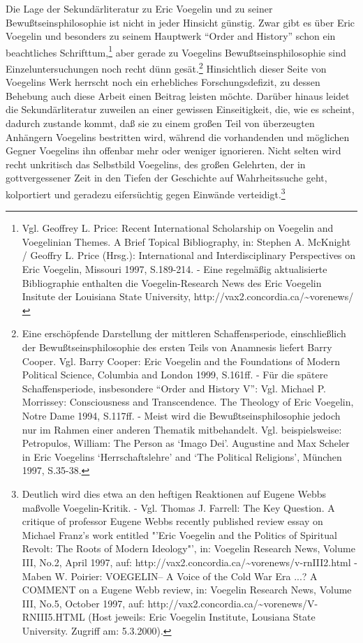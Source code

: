 Die Lage der Sekundärliteratur zu Eric Voegelin und zu seiner
Bewußtseinsphilosophie ist nicht in jeder Hinsicht günstig. Zwar gibt es über
Eric Voegelin und besonders zu seinem Hauptwerk "`Order and History"' schon
ein beachtliches Schrifttum,\footnote{Vgl. Geoffrey L. Price: Recent
  International Scholarship on Voegelin and Voegelinian Themes. A Brief
  Topical Bibliography, in: Stephen A. McKnight / Geoffry L. Price (Hrsg.):
  International and Interdisciplinary Perspectives on Eric Voegelin, Missouri
  1997, S.189-214. - Eine regelmäßig aktualisierte Bibliographie enthalten die
  Voegelin-Research News des Eric Voegelin Insitute der Louisiana State
  University, http://vax2.concordia.ca/\~{ }vorenews/} aber gerade zu Voegelins
Bewußtseinsphilosophie sind Einzeluntersuchungen noch recht dünn
gesät.\footnote{Eine erschöpfende Darstellung der mittleren Schaffensperiode,
  einschließlich der Bewußtseinsphilosophie des ersten Teils von Anamnesis
  liefert Barry Cooper. Vgl. Barry Cooper: Eric Voegelin and the Foundations
  of Modern Political Science, Columbia and London 1999, S.161ff. - Für die
  spätere Schaffensperiode, insbesondere "`Order and History V"': Vgl. Michael
  P. Morrissey: Consciousness and Transcendence. The Theology of Eric
  Voegelin, Notre Dame 1994, S.117ff. - Meist wird die Bewußtseinsphilosophie
  jedoch nur im Rahmen einer anderen Thematik mitbehandelt. Vgl.
  beispielsweise: Petropulos, William: The Person as `Imago Dei'. Augustine
  and Max Scheler in Eric Voegelins `Herrschaftslehre' and `The Political
  Religions', München 1997, S.35-38.} Hinsichtlich dieser Seite von Voegelins
Werk herrscht noch ein erhebliches Forschungsdefizit, zu dessen Behebung auch
diese Arbeit einen Beitrag leisten möchte. Darüber hinaus leidet die
Sekundärliteratur zuweilen an einer gewissen Einseitigkeit, die, wie es
scheint, dadurch zustande kommt, daß sie zu einem großen Teil von überzeugten
Anhängern Voegelins bestritten wird, während die vorhandenden und möglichen
Gegner Voegelins ihn offenbar mehr oder weniger ignorieren. Nicht selten wird
recht unkritisch das Selbstbild Voegelins, des großen Gelehrten, der in
gottvergessener Zeit in den Tiefen der Geschichte auf Wahrheitssuche geht,
kolportiert und geradezu eifersüchtig gegen Einwände
verteidigt.\footnote{Deutlich wird dies etwa an den heftigen Reaktionen auf
  Eugene Webbs maßvolle Voegelin-Kritik.  - Vgl. Thomas J.  Farrell: The Key
  Question. A critique of professor Eugene Webbs recently published review
  essay on Michael Franz's work entitled "'Eric Voegelin and the Politics of
  Spiritual Revolt: The Roots of Modern Ideology"', in: Voegelin Research
  News, Volume III, No.2, April 1997, auf:
  http://vax2.concordia.ca/\~{ }vorenews/v-rnIII2.html - Maben W. Poirier:
  VOEGELIN-- A Voice of the Cold War Era ...? A COMMENT on a Eugene Webb
  review, in: Voegelin Research News, Volume III, No.5, October 1997, auf:
  http://vax2.concordia.ca/\~{ }vorenews/V-RNIII5.HTML (Host jeweils: Eric
  Voegelin Institute, Lousiana State University. Zugriff am: 5.3.2000).}
